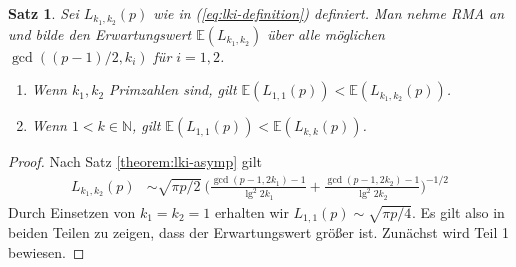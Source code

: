 \documentclass[a4paper, 11pt, ngerman]{article}
\newcommand{\E}{\mathbb{E}}
\newcommand{\N}{\mathbb{N}}
\theoremstyle{definition}
\theoremstyle{plain}
\newtheorem{theorem}{Satz}
\theoremstyle{remark}
\begin{document}
\begin{theorem}
    \label{theorem:optimal-k-m2}
    Sei $L_{k_1, k_2}(p)$ wie in (\ref{eq:lki-definition}) definiert. Man nehme RMA an und bilde den Erwartungswert $\E(L_{k_1, k_2})$ über alle möglichen $\gcd((p - 1)/2, k_i)$ für $i = 1, 2$.
    \begin{enumerate}
        \item Wenn $k_1, k_2$ Primzahlen sind, gilt $\E(L_{1, 1}(p)) < \E(L_{k_1, k_2}(p))$.
        \item Wenn $1 < k \in \N$, gilt $\E(L_{1, 1}(p)) < \E(L_{k, k}(p))$.
    \end{enumerate}
\end{theorem}

\begin{proof}
    Nach Satz \ref{theorem:lki-asymp} gilt
    \begin{align*}
        L_{k_1, k_2}(p)
         & \sim \sqrt{\pi p / 2} \
        \Bigg ( \frac {\gcd(p - 1, 2k_1) - 1} {\lg^2 2k_1} +
        \frac {\gcd(p -1, 2k_2) - 1} {\lg^2 2k_2} \Bigg )^{-1/2}
    \end{align*}
    Durch Einsetzen von $k_1 = k_2 = 1$ erhalten wir $L_{1, 1}(p) \sim \sqrt{\pi p / 4}$. Es gilt also in beiden Teilen zu zeigen, dass der Erwartungswert größer ist. Zunächst wird Teil 1 bewiesen.


\end{proof}
\end{document}
